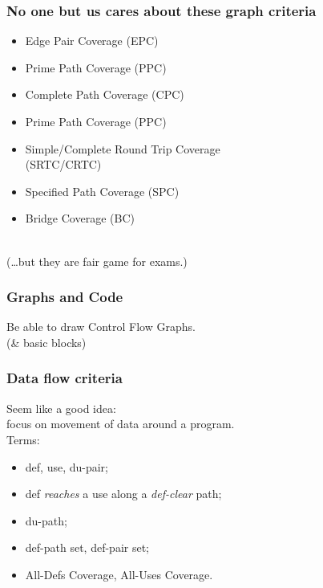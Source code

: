 \documentclass{beamer}
\newenvironment{changemargin}[1]{%
  \begin{list}{}{%
    \setlength{\topsep}{0pt}%
    \setlength{\leftmargin}{#1}%
    \setlength{\rightmargin}{1em}
    \setlength{\listparindent}{\parindent}%
    \setlength{\itemindent}{\parindent}%
    \setlength{\parsep}{\parskip}%
  }%
  \item[]}{\end{list}}
\begin{document}
\begin{frame}
  \frametitle{No one but us cares about these graph criteria}

  \Large
  \begin{changemargin}{1cm}
    \begin{itemize}
    \item Edge Pair Coverage (EPC)
    \item Prime Path Coverage (PPC)
    \item Complete Path Coverage (CPC)
    \item Prime Path Coverage (PPC)
    \item Simple/Complete Round Trip Coverage \\ \hspace*{2cm} (SRTC/CRTC)
    \item Specified Path Coverage (SPC)
      \item Bridge Coverage (BC)
    \end{itemize}
~\\[1em]
    (\ldots but they are fair game for exams.)
  \end{changemargin}
\end{frame}


\begin{frame}
  \frametitle{Graphs and Code}
  \begin{changemargin}{2cm}
    Be able to draw Control Flow Graphs.\\
    \hspace*{1cm} (\& basic blocks)
  \end{changemargin}
\end{frame}

\begin{frame}
  \frametitle{Data flow criteria}
  \begin{changemargin}{2cm}
    Seem like a good idea: \\
    \hspace*{1cm} focus on movement of data around a program.\\[1em]
    Terms:
    \begin{itemize}
    \item def, use, du-pair;
    \item def \emph{reaches} a use along a \emph{def-clear} path;
    \item du-path;
    \item def-path set, def-pair set;
      \item All-Defs Coverage, All-Uses Coverage.
    \end{itemize}
  \end{changemargin}
\end{frame}
\end{document}
